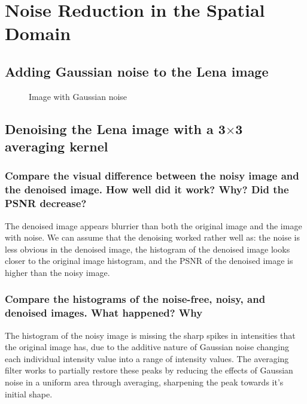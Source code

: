 \clearpage
\section{Noise Reduction in the Spatial Domain}


\subsection{Adding Gaussian noise to the Lena image}
\begin{figure}[ht]
\centering
	\caption{Image with Gaussian noise}
\end{figure}


\clearpage
\subsection{Denoising the Lena image with a 3$\times$3 averaging kernel}
\begin{figure}[ht]
\centering
\end{figure}

\subsubsection{Compare the visual difference between the noisy image and the denoised image. How well did it work? Why? Did the PSNR decrease?}
The denoised image appears blurrier than both the original image and the image with noise. We can assume that the denoising worked rather well as: the noise is less obvious in the denoised image, the histogram of the denoised image looks closer to the original image histogram, and the PSNR of the denoised image is higher than the noisy image.

\subsubsection{Compare the histograms of the noise-free, noisy, and denoised images. What happened? Why}
The histogram of the noisy image is missing the sharp spikes in intensities that the original image has, due to the additive nature of Gaussian noise changing each individual intensity value into a range of intensity values. The averaging filter works to partially restore these peaks by reducing the effects of Gaussian noise in a uniform area through averaging, sharpening the peak towards it's initial shape.

